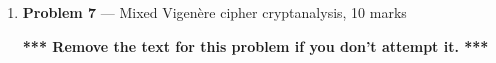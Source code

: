 \documentclass[11pt]{article}
\theoremstyle{definition}
\begin{document}
\begin{enumerate}
\newpage

\item[] \textbf{Problem 7} --- Mixed Vigen\`ere cipher cryptanalysis, 10 marks

\textbf{*** Remove the text for this problem if you don't attempt it. ***}


\end{enumerate}
\end{document}
